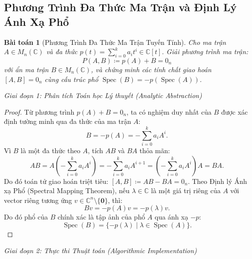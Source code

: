 \documentclass{article}
\newtheorem{baitoan}{Bài toán}
\begin{document}
\subsection{Phương Trình Đa Thức Ma Trận và Định Lý Ánh Xạ Phổ}

\begin{baitoan}[Phương Trình Đa Thức Ma Trận Tuyến Tính]
Cho ma trận $A \in M_n(\mathbb{C})$ và đa thức $p(t) = \sum_{i=0}^k a_i t^i \in \mathbb{C}[t]$. Giải phương trình ma trận:
\begin{equation}
    P(A, B) \coloneqq p(A) + B = 0_n
\end{equation}
với ẩn ma trận $B \in M_n(\mathbb{C})$, và chứng minh các tính chất giao hoán $[A, B] = 0_n$ cùng cấu trúc phổ $\operatorname{Spec}(B) = -p(\operatorname{Spec}(A))$.
\end{baitoan}

\vspace{0.5em}\noindent\emph{Giai đoạn 1: Phân tích Toán học Lý thuyết (Analytic Abstraction)}

\begin{proof}
Từ phương trình $p(A) + B = 0_n$, ta có nghiệm duy nhất của $B$ được xác định tường minh qua đa thức của ma trận $A$:
\begin{equation}
    B = -p(A) = -\sum_{i=0}^k a_i A^i.
\end{equation}
Vì $B$ là một đa thức theo $A$, tích $AB$ và $BA$ thỏa mãn:
\begin{equation}
    AB = A\left(-\sum_{i=0}^k a_i A^i\right) = -\sum_{i=0}^k a_i A^{i+1} = \left(-\sum_{i=0}^k a_i A^i\right) A = BA.
\end{equation}
Do đó toán tử giao hoán triệt tiêu: $[A, B] \coloneqq AB - BA = 0_n$.
Theo Định lý Ánh xạ Phổ (Spectral Mapping Theorem), nếu $\lambda \in \mathbb{C}$ là một giá trị riêng của $A$ với vector riêng tương ứng $v \in \mathbb{C}^n \setminus \{\mathbf{0}\}$, thì:
\begin{equation}
    Bv = -p(A)v = -p(\lambda)v.
\end{equation}
Do đó phổ của $B$ chính xác là tập ảnh của phổ $A$ qua ánh xạ $-p$:
\begin{equation}
    \operatorname{Spec}(B) = \{-p(\lambda) \mid \lambda \in \operatorname{Spec}(A)\}.
\end{equation}
\end{proof}

\vspace{0.5em}\noindent\emph{Giai đoạn 2: Thực thi Thuật toán (Algorithmic Implementation)}

\end{document}
